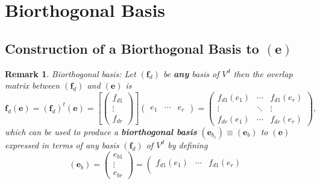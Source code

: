\documentclass[aps,preprint]{revtex4}
\newtheorem{remark}[theorem]{Remark}
\begin{document}
\section{Biorthogonal Basis}

\subsection{Construction of a Biorthogonal Basis to $\left( \boldsymbol{e}%
\right) $ \label{Construction of a Biorthogonal Basis}}

\begin{remark}
Biorthogonal basis: Let $\left( \boldsymbol{f}_{d}\right) $ be \textbf{any}
basis of $V^{d}$ then the \emph{overlap matrix} between $\left( \boldsymbol{f%
}_{d}\right) $ and $\left( \boldsymbol{e}\right) $ is 
\begin{equation}
\boldsymbol{f}_{d}\left( \boldsymbol{e}\right) =\left( \boldsymbol{f}%
_{d}\right) ^{t}\left( \boldsymbol{e}\right) =\left[ \left( 
\begin{array}{c}
f_{d1} \\ 
\vdots \\ 
f_{dr}%
\end{array}%
\right) \right] \left( 
\begin{array}{ccc}
e_{1} & \cdots & e_{r}%
\end{array}%
\right) =\left( 
\begin{array}{ccc}
f_{d1}\left( e_{1}\right) & \cdots & f_{d1}\left( e_{r}\right) \\ 
\vdots & \ddots & \vdots \\ 
f_{dr}\left( e_{1}\right) & \cdots & f_{dr}\left( e_{r}\right)%
\end{array}%
\right) ,
\end{equation}%
which can be used to produce a \textbf{biorthogonal basis} $\left( 
\boldsymbol{e}_{b_{e}}\right) \equiv \left( \boldsymbol{e}_{b}\right) $ to $%
\left( \boldsymbol{e}\right) $ expressed in terms of any basis $\left( 
\boldsymbol{f}_{d}\right) $ of $V^{d}$ by defining 
\begin{equation}
\left( \overset{}{\boldsymbol{e}_{b}}\right) =\left( 
\begin{array}{c}
e_{b1} \\ 
\vdots \\ 
e_{br}%
\end{array}%
\right) =\left( 
\begin{array}{ccc}
f_{d1}\left( e_{1}\right) & \cdots & f_{d1}\left( e_{r}\right) \\ 

\end{array}
\end{equation}
\end{remark}
\end{document}
